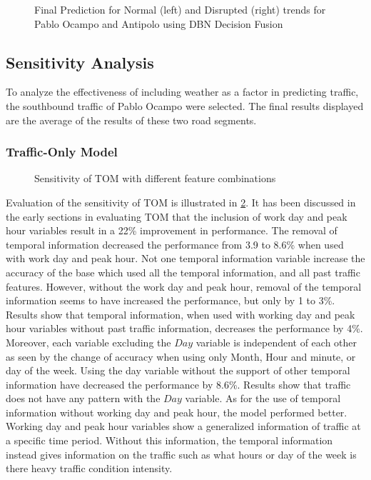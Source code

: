 \begin{figure}[h]
  \centering
  \captionsetup{justification=centering}
  \caption{Final Prediction for Normal (left) and Disrupted (right) trends for Pablo Ocampo and Antipolo using DBN Decision Fusion}
  \label{fig:final_prediction}
\end{figure}



\subsection{Sensitivity Analysis}
To analyze the effectiveness of including weather as a factor in predicting traffic, the southbound traffic of Pablo Ocampo were selected. The final results displayed are the average of the results of these two road segments.

\subsubsection{Traffic-Only Model}

\begin{figure}[h]
  \centering
  \captionsetup{justification=centering}
  \caption{Sensitivity of TOM with different feature combinations}
  \label{fig:TOM_sensitivity}
\end{figure}

Evaluation of the sensitivity of TOM is illustrated in \ref{fig:TOM_sensitivity}. It has been discussed in the early sections in evaluating TOM that the inclusion of work day and peak hour variables result in a 22\% improvement in performance. The removal of temporal information decreased the performance from 3.9 to 8.6\% when used with work day and peak hour. Not one temporal information variable increase the accuracy of the base which used all the temporal information, and all past traffic features. However, without the work day and peak hour, removal of the temporal information seems to have increased the performance, but only by 1 to 3\%. Results show that temporal information, when used with working day and peak hour variables without past traffic information, decreases the performance by 4\%. Moreover, each variable excluding the $Day$ variable is independent of each other as seen by the change of accuracy when using only Month, Hour and minute, or day of the week. Using the day variable without the support of other temporal information have decreased the performance by 8.6\%. Results show that traffic does not have any pattern with the $Day$ variable. As for the use of temporal information without working day and peak hour, the model performed better. Working day and peak hour variables show a generalized information of traffic at a specific time period. Without this information, the temporal information instead gives information on the traffic such as what hours or day of the week is there heavy traffic condition intensity. 

